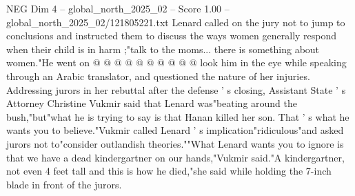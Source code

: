 \begin{textsample}{NEG Dim 4 – global\_north\_2025\_02 – Score 1.00 – global\_north\_2025\_02/121805221.txt}
Lenard called on the jury not to jump to conclusions and instructed them to discuss the ways women generally respond when their child is in harm ;"talk to the moms... there is something about women."He went on @ @ @ @ @ @ @ @ @ @ look him in the eye while speaking through an Arabic translator, and questioned the nature of her injuries.
Addressing jurors in her rebuttal after the defense ' s closing, Assistant State ' s Attorney Christine Vukmir said that Lenard was"beating around the bush,"but"what he is trying to say is that Hanan killed her son.
That ' s what he wants you to believe."Vukmir called Lenard ' s implication"ridiculous"and asked jurors not to"consider outlandish theories.""What Lenard wants you to ignore is that we have a dead kindergartner on our hands,"Vukmir said."A kindergartner, not even 4 feet tall and this is how he died,"she said while holding the 7-inch blade in front of the jurors.

\end{textsample}
